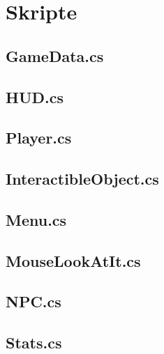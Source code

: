 \chapter{Skripte}

\section{GameData.cs}


\section{HUD.cs}


\section{Player.cs}


\section{InteractibleObject.cs}


\section{Menu.cs}


\section{MouseLookAtIt.cs}


\section{NPC.cs}


\section{Stats.cs}


